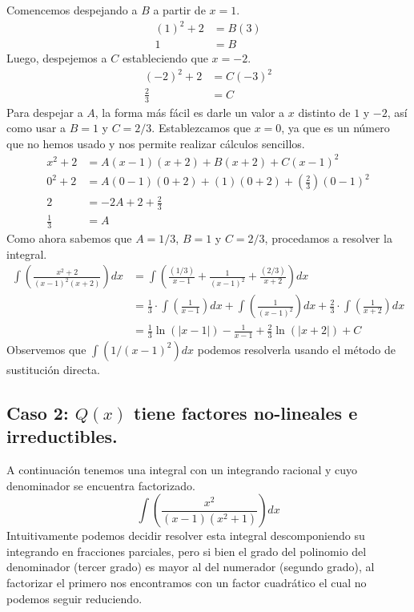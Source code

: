 \documentclass[12pt]{article}
\begin{document}
Comencemos despejando a $B$ a partir de $x = 1$.
\begin{align*}
  (1)^{2} + 2 &= B(3) \\
  1 &= B
\end{align*}
Luego, despejemos a $C$ estableciendo que $x = -2$.
\begin{align*}
  (-2)^{2} + 2 &= C(-3)^{2}\\
  \frac{2}{3} &= C
\end{align*}
Para despejar a $A$, la forma más fácil es darle un valor a $x$ distinto de $1$ y $-2$, así como usar  a $B = 1$ y $C = 2/3$. Establezcamos que $x = 0$, ya que es un número que no hemos usado y nos permite realizar cálculos sencillos.
\begin{align*}
  x^{2} + 2 &= A(x - 1)(x + 2) + B(x + 2) + C(x - 1)^{2} \\
  0^{2} + 2 &= A(0 - 1)(0 + 2) + (1)(0 + 2) + \left(\frac{2}{3}\right)(0 - 1)^{2} \\
  2 &= -2A + 2 + \frac{2}{3} \\
  \frac{1}{3} &= A
\end{align*}
Como ahora sabemos que $A = 1/3$, $B = 1$ y $C = 2/3$, procedamos a resolver la integral.
\begin{align*}
  \int \left(\frac{x^{2} + 2}{(x - 1)^{2}(x + 2)}\right) dx &= \int \left(\frac{(1/3)}{x - 1} + \frac{1}{(x - 1)^{2}} + \frac{(2/3)}{x + 2}\right) dx \\
                                                            &= \frac{1}{3} \cdot \int \left(\frac{1}{x - 1}\right) dx +
                                                               \int \left(\frac{1}{(x - 1)^{2}}\right)dx +
                                                               \frac{2}{3} \cdot \int \left(\frac{1}{x + 2}\right) dx \\
                                                            &= \frac{1}{3} \ln(|x - 1|) - \frac{1}{x - 1} + \frac{2}{3} \ln(|x + 2|) + C
\end{align*}
Observemos que $\int (1/(x - 1)^{2}) dx$ podemos resolverla usando el método de sustitución directa.

\subsection{Caso 2: \texorpdfstring{$Q(x)$}{Denominador} tiene factores no-lineales e irreductibles.}

A continuación tenemos una integral con un integrando racional y cuyo denominador se encuentra factorizado.
\[
  \int \left(\frac{x^{2}}{(x - 1)(x^{2} + 1)}\right) dx
\]
Intuitivamente podemos decidir resolver esta integral descomponiendo su integrando en fracciones parciales, pero si bien el grado del polinomio del denominador (tercer grado) es mayor al del numerador (segundo grado), al factorizar el primero nos encontramos con un factor cuadrático el cual no podemos seguir reduciendo.
\end{document}
